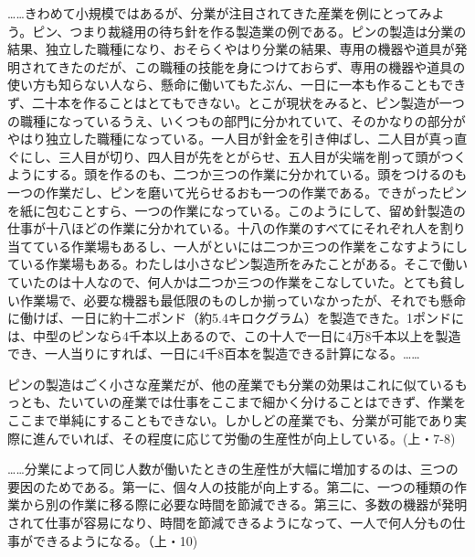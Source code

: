 ……きわめて小規模ではあるが、分業が注目されてきた産業を例にとってみよう。ピン、つまり裁縫用の待ち針を作る製造業の例である。ピンの製造は分業の結果、独立した職種になり、おそらくやはり分業の結果、専用の機器や道具が発明されてきたのだが、この職種の技能を身につけておらず、専用の機器や道具の使い方も知らない人なら、懸命に働いてもたぶん、一日に一本も作ることもできず、二十本を作ることはとてもできない。とこが現状をみると、ピン製造が一つの職種になっているうえ、いくつもの部門に分かれていて、そのかなりの部分がやはり独立した職種になっている。一人目が針金を引き伸ばし、二人目が真っ直ぐにし、三人目が切り、四人目が先をとがらせ、五人目が尖端を削って頭がつくようにする。頭を作るのも、二つか三つの作業に分かれている。頭をつけるのも一つの作業だし、ピンを磨いて光らせるおも一つの作業である。できがったピンを紙に包むことすら、一つの作業になっている。このようにして、留め針製造の仕事が十八ほどの作業に分かれている。十八の作業のすべてにそれぞれ人を割り当てている作業場もあるし、一人がといには二つか三つの作業をこなすようにしている作業場もある。わたしは小さなピン製造所をみたことがある。そこで働いていたのは十人なので、何人かは二つか三つの作業をこなしていた。とても貧しい作業場で、必要な機器も最低限のものしか揃っていなかったが、それでも懸命に働けば、一日に約十二ポンド（約5.4キロクグラム）を製造できた。1ポンドには、中型のピンなら4千本以上あるので、この十人で一日に4万8千本以上を製造でき、一人当りにすれば、一日に4千8百本を製造できる計算になる。……


ピンの製造はごく小さな産業だが、他の産業でも分業の効果はこれに似ているもっとも、たいていの産業では仕事をここまで細かく分けることはできず、作業をここまで単純にすることもできない。しかしどの産業でも、分業が可能であり実際に進んでいれば、その程度に応じて労働の生産性が向上している。(上・7-8)

……分業によって同じ人数が働いたときの生産性が大幅に増加するのは、三つの要因のためである。第一に、個々人の技能が向上する。第二に、一つの種類の作業から別の作業に移る際に必要な時間を節減できる。第三に、多数の機器が発明されて仕事が容易になり、時間を節減できるようになって、一人で何人分もの仕事ができるようになる。（上・10)


\subsection{}



